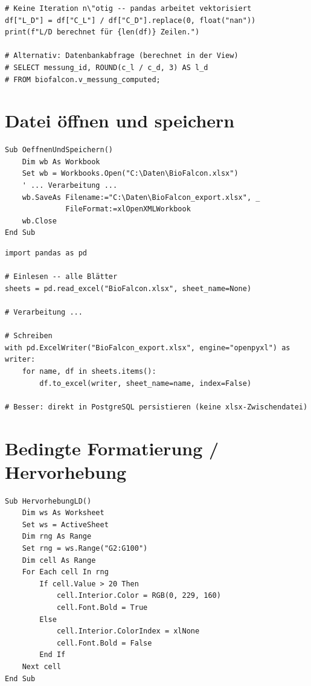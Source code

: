 \documentclass[12pt,a4paper]{report}
\theoremstyle{definition}
\theoremstyle{remark}
\begin{document}
\begin{lstlisting}[style=python, caption={Python-\"Aquivalent: Vektorisierte Berechnung}]
# Keine Iteration n\"otig -- pandas arbeitet vektorisiert
df["L_D"] = df["C_L"] / df["C_D"].replace(0, float("nan"))
print(f"L/D berechnet für {len(df)} Zeilen.")

# Alternativ: Datenbankabfrage (berechnet in der View)
# SELECT messung_id, ROUND(c_l / c_d, 3) AS l_d
# FROM biofalcon.v_messung_computed;
\end{lstlisting}

\section{Datei \"offnen und speichern}

\begin{lstlisting}[style=vba, caption={VBA: Workbook \"offnen und speichern}]
Sub OeffnenUndSpeichern()
    Dim wb As Workbook
    Set wb = Workbooks.Open("C:\Daten\BioFalcon.xlsx")
    ' ... Verarbeitung ...
    wb.SaveAs Filename:="C:\Daten\BioFalcon_export.xlsx", _
              FileFormat:=xlOpenXMLWorkbook
    wb.Close
End Sub
\end{lstlisting}

\begin{lstlisting}[style=python, caption={Python-\"Aquivalent: pandas read/write}]
import pandas as pd

# Einlesen -- alle Blätter
sheets = pd.read_excel("BioFalcon.xlsx", sheet_name=None)

# Verarbeitung ...

# Schreiben
with pd.ExcelWriter("BioFalcon_export.xlsx", engine="openpyxl") as writer:
    for name, df in sheets.items():
        df.to_excel(writer, sheet_name=name, index=False)

# Besser: direkt in PostgreSQL persistieren (keine xlsx-Zwischendatei)
\end{lstlisting}

\section{Bedingte Formatierung / Hervorhebung}

\begin{lstlisting}[style=vba, caption={VBA: Zellen bei L/D > 20 grün einfärben}]
Sub HervorhebungLD()
    Dim ws As Worksheet
    Set ws = ActiveSheet
    Dim rng As Range
    Set rng = ws.Range("G2:G100")
    Dim cell As Range
    For Each cell In rng
        If cell.Value > 20 Then
            cell.Interior.Color = RGB(0, 229, 160)
            cell.Font.Bold = True
        Else
            cell.Interior.ColorIndex = xlNone
            cell.Font.Bold = False
        End If
    Next cell
End Sub
\end{lstlisting}
\end{document}
